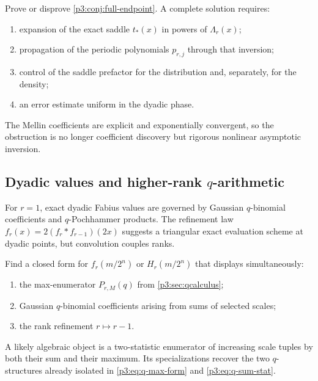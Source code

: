 \documentclass[11pt,oneside]{article}
\theoremstyle{definition}
\theoremstyle{remark}
\begin{document}
\begin{frontierproblem}
Prove or disprove \cref{p3:conj:full-endpoint}.  A complete solution requires:
\begin{enumerate}[label=(\roman*)]
\item expansion of the exact saddle $t_*(x)$ in powers of $\Lambda_r(x)$;
\item propagation of the periodic polynomials $p_{r,j}$ through that inversion;
\item control of the saddle prefactor for the distribution and, separately, for the density;
\item an error estimate uniform in the dyadic phase.
\end{enumerate}
The Mellin coefficients are explicit and exponentially convergent, so the obstruction is no longer coefficient discovery but rigorous nonlinear asymptotic inversion.
\end{frontierproblem}

\subsection{Dyadic values and higher-rank \texorpdfstring{$q$}{q}-arithmetic}

For $r=1$, exact dyadic Fabius values are governed by Gaussian $q$-binomial coefficients and $q$-Pochhammer products.  The refinement law
$f_r(x)=2(f_r*f_{r-1})(2x)$ suggests a triangular exact evaluation scheme at dyadic points, but convolution couples ranks.

\begin{frontierproblem}
Find a closed form for $f_r(m/2^n)$ or $H_r(m/2^n)$ that displays simultaneously:
\begin{enumerate}[label=(\roman*)]
\item the max-enumerator $P_{r,M}(q)$ from \cref{p3:sec:qcalculus};
\item Gaussian $q$-binomial coefficients arising from sums of selected scales;
\item the rank refinement $r\mapsto r-1$.
\end{enumerate}
A likely algebraic object is a two-statistic enumerator of increasing scale tuples by both their sum and their maximum.  Its specializations recover the two $q$-structures already isolated in \eqref{p3:eq:q-max-form} and \eqref{p3:eq:q-sum-stat}.
\end{frontierproblem}
\end{document}
